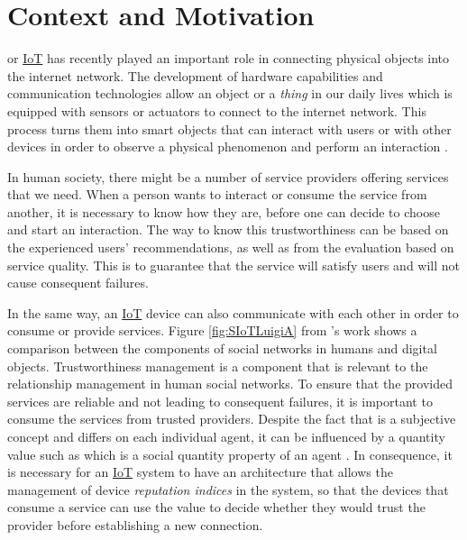 \section{Context and Motivation} \label{Introduction-Context}

\npara {} or \hyperref[Acronym-IoT]{IoT} has recently played an important role in connecting physical objects into the internet network.
The development of hardware capabilities and communication technologies allow an object or a \textit{thing} in our daily lives which is equipped with sensors or actuators to connect to the internet network.
This process turns them into smart objects that can interact with users or with other devices in order to observe a physical phenomenon and perform an interaction \citep{SEnviro}.

\npara In human society, there might be a number of service providers offering services that we need.
When a person wants to interact or consume the service from another, it is necessary to know how  they are, before one can decide to choose and start an interaction.
The way to know this trustworthiness can be based on the experienced users' recommendations, as well as from the evaluation based on service quality.
This is to guarantee that the service will satisfy users and will not cause consequent failures.

\npara In the same way, an \hyperref[Acronym-IoT]{IoT} device can also communicate with each other in order to consume or provide services.
Figure \ref{fig:SIoTLuigiA} from \cite{SIoTSocialStructure}'s work shows a comparison between the components of social networks in humans and digital objects.
Trustworthiness management is a component that is relevant to the relationship management in human social networks.
To ensure that the provided services are reliable and not leading to consequent failures, it is important to consume the services from trusted providers.
Despite the fact that  is a subjective concept and differs on each individual agent, it can be influenced by a quantity value such as  which is a social quantity property of an agent \citep{ComputationalModelTrust}.
In consequence, it is necessary for an \hyperref[Acronym-IoT]{IoT} system to have an architecture that allows the management of device \textit{reputation indices} in the system, so that the devices that consume a service can use the value to decide whether they would trust the provider before establishing a new connection.

